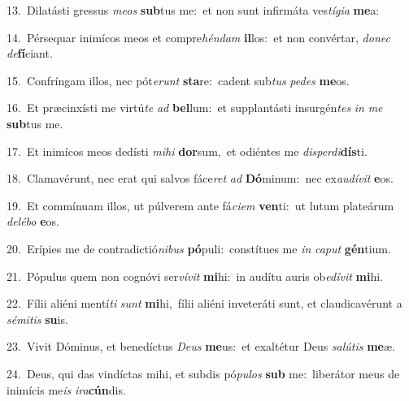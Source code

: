 {\numbfont\textcolor{\numbcolor}{13.}}~Dilatásti gressus \textit{me}\-\textit{os} \textbf{sub}\-tus me:~\star et non sunt infirmáta ves\-\textit{tí}\-\textit{gi}\textit{a} \textbf{me}\-a:\par
{\numbfont\textcolor{\numbcolor}{14.}}~Pérsequar inimícos meos et compre\-\textit{hén}\-\textit{dam} \textbf{il}\-los:~\star et non convértar, \textit{do}\-\textit{nec} \textit{de}\-\textbf{fí}ciant.\par
{\numbfont\textcolor{\numbcolor}{15.}}~Confríngam illos, nec pót\-\textit{e}\-\textit{runt} \textbf{sta}\-re:~\star cadent sub\textit{tus} \textit{pe}\-\textit{des} \textbf{me}\-os.\par
{\numbfont\textcolor{\numbcolor}{16.}}~Et præcinxísti me virtú\textit{te} \textit{ad} \textbf{bel}\-lum:~\star et supplantásti insurgén\textit{tes} \textit{in} \textit{me} \textbf{sub}\-tus me.\par
{\numbfont\textcolor{\numbcolor}{17.}}~Et inimícos meos dedísti \textit{mi}\-\textit{hi} \textbf{dor}\-sum,~\star et odiéntes me \textit{dis}\-\textit{per}\textit{di}\textbf{dís}ti.\par
{\numbfont\textcolor{\numbcolor}{18.}}~Clamavérunt, nec erat qui salvos fáce\textit{ret} \textit{ad} \textbf{Dó}\-minum:~\star nec ex\-\textit{au}\-\textit{dí}\textit{vit} \textbf{e}\-os.\par
{\numbfont\textcolor{\numbcolor}{19.}}~Et commínuam illos, ut púlverem ante fá\-\textit{ci}\-\textit{em} \textbf{ven}\-ti:~\star ut lutum plateárum \textit{de}\-\textit{lé}\textit{bo} \textbf{e}\-os.\par
{\numbfont\textcolor{\numbcolor}{20.}}~Erípies me de contradictió\-\textit{ni}\-\textit{bus} \textbf{pó}\-puli:~\star constítues me \textit{in} \textit{ca}\-\textit{put} \textbf{gén}\-tium.\par
{\numbfont\textcolor{\numbcolor}{21.}}~Pópulus quem non cognóvi ser\-\textit{ví}\-\textit{vit} \textbf{mi}\-hi:~\star in audítu auris ob\-\textit{e}\-\textit{dí}\textit{vit} \textbf{mi}\-hi.\par
{\numbfont\textcolor{\numbcolor}{22.}}~Fílii aliéni mentí\textit{ti} \textit{sunt} \textbf{mi}\-hi,~\star fílii aliéni inveteráti sunt, et claudicavérunt a \textit{sé}\-\textit{mi}\textit{tis} \textbf{su}\-is.\par
{\numbfont\textcolor{\numbcolor}{23.}}~Vivit Dóminus, et benedíctus \textit{De}\-\textit{us} \textbf{me}\-us:~\star et exaltétur Deus \textit{sa}\-\textit{lú}\textit{tis} \textbf{me}\-æ.\par
{\numbfont\textcolor{\numbcolor}{24.}}~Deus, qui das vindíctas mihi, et subdis pó\-\textit{pu}\-\textit{los} \textbf{sub} me:~\star liberátor meus de inimícis me\textit{is} \textit{i}\-\textit{ra}\textbf{cún}dis.\par
